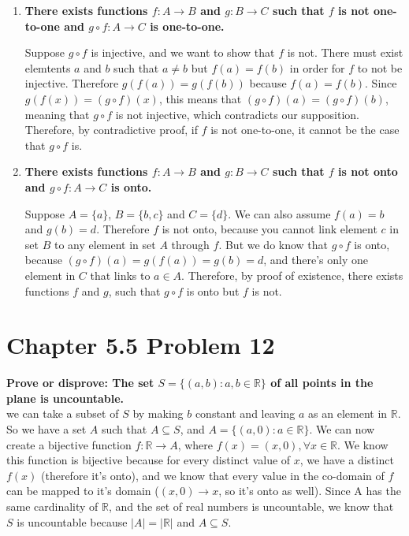 \documentclass[10pt]{article}
\begin{document}
\begin{enumerate}[label=(\alph*)]

    \item \textbf{There exists functions $f: A \to B$ and $g: B \to C$ such that $f$ is not one-to-one and $g \circ f: A \to C$
        is one-to-one.}

        Suppose $g \circ f$ is injective, and we want to show that $f$ is not.  There must exist elemtents $a$ and $b$ such that $a \not= b$ but 
        $f(a) = f(b)$ in order for $f$ to not be injective.  Therefore $g(f(a)) = g(f(b))$ because $f(a) = f(b)$.  Since $g(f(x)) = (g \circ f)(x)$, 
        this means that $(g \circ f)(a) = (g \circ f)(b)$, meaning that $g \circ f$ is not injective, which contradicts our supposition.  Therefore, 
        by contradictive proof, if $f$ is not one-to-one, it cannot be the case that $g \circ f$ is.

    \item \textbf{There exists functions $f: A \to B$ and $g: B \to C$ such that $f$ is not onto and $g \circ f: A \to C$ is onto.}

        Suppose $A = \{a\}$, $B = \{b,c\}$ and $C = \{d\}$.  We can also assume $f(a) = b$ and $g(b) = d$.  Therefore $f$ is not onto, because you cannot
        link element $c$ in set $B$ to any element in set $A$ through $f$.  But we do know that $g \circ f$ is onto, because $(g \circ f)(a) = g(f(a)) = g(b) = d$,
        and there's only one element in $C$ that links to $a \in A$.  Therefore, by proof of existence, there exists functions $f$ and $g$, such that 
        $g \circ f$ is onto but $f$ is not.

\end{enumerate}



\section{Chapter 5.5 Problem 12}
\textbf{Prove or disprove: The set $S = \{(a,b): a,b \in \mathbb{R}\}$ of all points in the plane is uncountable.} \\

we can take a subset of $S$ by making $b$ constant and leaving $a$ as an element in $\mathbb{R}$.  So we have a set $A$ such that  $A \subseteq S$, and 
$A = \{(a,0): a \in \mathbb{R}\}$.  We can now create a bijective function $f: \mathbb{R} \to A$, where $f(x) = (x,0), \forall x \in \mathbb{R}$.  We know this 
function is bijective because for every distinct value of $x$, we have a distinct $f(x)$ (therefore it's onto), and we know that every value in the co-domain of 
$f$ can be mapped to it's domain ($(x,0) \to x$, so it's onto as well).  Since A has the same cardinality of $\mathbb{R}$, and the set of real numbers is uncountable,
we know that $S$ is uncountable because $|A| = |\mathbb{R}|$ and $A \subseteq S$.
\end{document}
